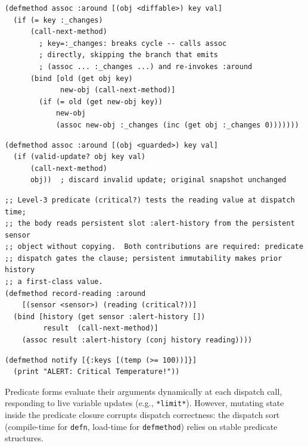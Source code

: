 \documentclass[sigconf,nonacm]{acmart}
\begin{document}
\begin{lstlisting}[caption={Automatic Structural Diff (FOL)}, label={lst:diff}, breaklines=false]
(defmethod assoc :around [(obj <diffable>) key val]
  (if (= key :_changes)
      (call-next-method)
        ; key=:_changes: breaks cycle -- calls assoc
        ; directly, skipping the branch that emits
        ; (assoc ... :_changes ...) and re-invokes :around
      (bind [old (get obj key)
             new-obj (call-next-method)]
        (if (= old (get new-obj key))
            new-obj
            (assoc new-obj :_changes (inc (get obj :_changes 0)))))))
\end{lstlisting}

\begin{lstlisting}[caption={Validated Update Guard (FOL)}, label={lst:guard}]
(defmethod assoc :around [(obj <guarded>) key val]
  (if (valid-update? obj key val)
      (call-next-method)
      obj))  ; discard invalid update; original snapshot unchanged
\end{lstlisting}

\begin{lstlisting}[caption={Predicate Dispatch on Persistent State (FOL)}, label={lst:predicate-persistent}, breaklines=true]
;; Level-3 predicate (critical?) tests the reading value at dispatch time;
;; the body reads persistent slot :alert-history from the persistent sensor
;; object without copying.  Both contributions are required: predicate
;; dispatch gates the clause; persistent immutability makes prior history
;; a first-class value.
(defmethod record-reading :around
    [(sensor <sensor>) (reading (critical?))]
  (bind [history (get sensor :alert-history [])
         result  (call-next-method)]
    (assoc result :alert-history (conj history reading))))
\end{lstlisting}

\begin{lstlisting}[caption={Value-Based Alerting (FOL)}, label={lst:observable}]
(defmethod notify [{:keys [(temp (>= 100))]}]
  (print "ALERT: Critical Temperature!"))
\end{lstlisting}

\noindent Predicate forms evaluate their arguments dynamically at each dispatch call, responding to live variable updates (e.g., \texttt{*limit*}).
However, mutating state inside the predicate closure corrupts dispatch correctness: the dispatch sort (compile-time for \texttt{defn}, load-time for \texttt{defmethod}) relies on stable predicate structures.
\end{document}
